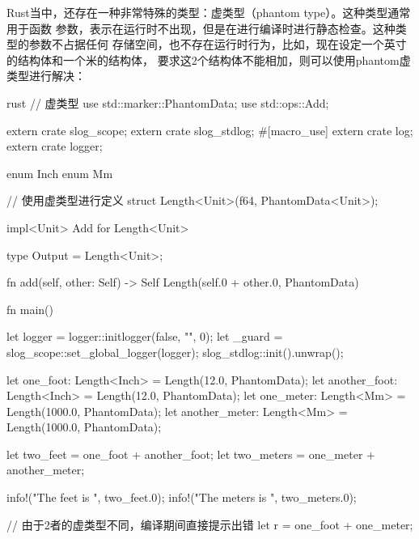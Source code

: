 Rust当中，还存在一种非常特殊的类型：虚类型（phantom type）。这种类型通常用于函数
参数，表示在运行时不出现，但是在进行编译时进行静态检查。这种类型的参数不占据任何
存储空间，也不存在运行时行为，比如，现在设定一个英寸的结构体和一个米的结构体，
要求这2个结构体不能相加，则可以使用phantom虚类型进行解决：
\begin{code-block}{rust}
// 虚类型
use std::marker::PhantomData;
use std::ops::Add;

extern crate slog_scope;
extern crate slog_stdlog;
#[macro_use]
extern crate log;
extern crate logger;

enum Inch {}
enum Mm {}

// 使用虚类型进行定义
struct Length<Unit>(f64, PhantomData<Unit>);

impl<Unit> Add for Length<Unit> {
    type Output = Length<Unit>;

    fn add(self, other: Self) -> Self {
        Length(self.0 + other.0, PhantomData)
    }
}

fn main() {
    let logger = logger::initlogger(false, "", 0);
    let _guard = slog_scope::set_global_logger(logger);
    slog_stdlog::init().unwrap();

    let one_foot: Length<Inch> = Length(12.0, PhantomData);
    let another_foot: Length<Inch> = Length(12.0, PhantomData);
    let one_meter: Length<Mm> = Length(1000.0, PhantomData);
    let another_meter: Length<Mm> = Length(1000.0, PhantomData);

    let two_feet = one_foot + another_foot;
    let two_meters = one_meter + another_meter;

    info!("The feet is {}", two_feet.0);
    info!("The meters is {}", two_meters.0);

    // 由于2者的虚类型不同，编译期间直接提示出错
    let r = one_foot + one_meter;
}
\end{code-block}

